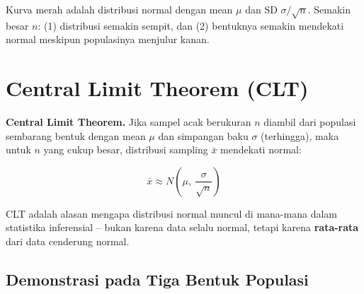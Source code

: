 \documentclass[
  indonesian,
  letterpaper,
]{book}
\begin{document}
Kurva merah adalah distribusi normal dengan mean \(\mu\) dan SD
\(\sigma/\sqrt{n}\). Semakin besar \(n\): (1) distribusi semakin sempit,
dan (2) bentuknya semakin mendekati normal meskipun populasinya menjulur
kanan.

\section{Central Limit Theorem (CLT)}\label{central-limit-theorem-clt}

\begin{tcolorbox}[enhanced jigsaw, arc=.35mm, bottomrule=.15mm, bottomtitle=1mm, breakable, colback=white, colbacktitle=quarto-callout-note-color!10!white, colframe=quarto-callout-note-color-frame, coltitle=black, left=2mm, leftrule=.75mm, opacityback=0, opacitybacktitle=0.6, rightrule=.15mm, title=\textcolor{quarto-callout-note-color}{\faInfo}\hspace{0.5em}{Catatan}, titlerule=0mm, toprule=.15mm, toptitle=1mm]

\textbf{Central Limit Theorem.} Jika sampel acak berukuran \(n\) diambil
dari populasi sembarang bentuk dengan mean \(\mu\) dan simpangan baku
\(\sigma\) (terhingga), maka untuk \(n\) yang cukup besar, distribusi
sampling \(\bar{x}\) mendekati normal:

\[
\bar{x} \approx N\!\left(\mu,\ \frac{\sigma}{\sqrt{n}}\right)
\]

\end{tcolorbox}

CLT adalah alasan mengapa distribusi normal muncul di mana-mana dalam
statistika inferensial -- bukan karena data selalu normal, tetapi karena
\textbf{rata-rata} dari data cenderung normal.

\subsection{Demonstrasi pada Tiga Bentuk
Populasi}\label{demonstrasi-pada-tiga-bentuk-populasi}
\end{document}
